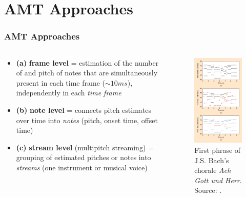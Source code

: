 \documentclass{beamer}
\newcommand{\emp}[1]{\textcolor{tum}{\textbf{#1}}}
\begin{document}
\section{AMT Approaches}
\begin{frame}[shrink=15]
	\frametitle{AMT Approaches}

	\begin{columns}
		\begin{column}{0.4\textwidth}
			\begin{itemize}
				\item \emp{(a)} \textbf{frame level} = estimation of the number of and pitch of notes that are simultaneously present in each time frame ($\sim 10ms$), independently in each \textit{time frame}
				      \vspace{2mm}
				\item \emp{(b)} \textbf{note level} = connects pitch estimates over time into \textit{notes} (pitch, onset time, offset time)
				      \vspace{2mm}
				\item \emp{(c)} \textbf{stream level} (multipitch streaming) = grouping of estimated pitches or notes into \textit{streams} (one instrument or musical voice)
			\end{itemize}
		\end{column}

		\begin{column}{0.6\textwidth}
			\begin{figure}[!ht]
				\centering
				\includegraphics[width=.55\textwidth]{transcriptions.png}
				\caption{First phrase of J.S. Bach's chorale \textit{Ach Gott und Herr}. Source: \cite{Overview}.}
				\label{fig:transcriptions}
			\end{figure}
		\end{column}
	\end{columns}

\end{frame}
\end{document}
